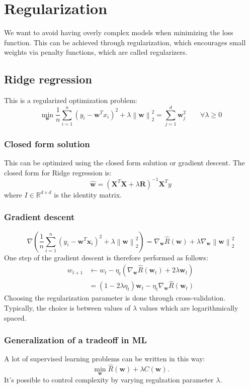\documentclass[a4paper,10pt,twoside]{article}
\newcommand\norm[1]{\left\lVert#1\right\rVert}
\begin{document}
\section{Regularization}
We want to avoid having overly complex models when minimizing the loss function. This can be achieved through regularization, which encourages small weights via penalty functions, which are called regularizers.

\subsection{Ridge regression}
This is a regularized optimization problem:
\begin{equation*}
    \min_{\mathbf{w}}\frac{1}{n}\sum_{i=1}^{n}(y_i-\mathbf{w}^Tx_i)^2+\lambda\norm{\mathbf{w}}^{2}_{2}=\sum_{j=1}^{d}\mathbf{w}_j^2\qquad\forall\lambda\geq 0
\end{equation*}
\subsubsection{Closed form solution}
This can be optimized using the closed form solution or gradient descent. The closed form for Ridge regression is:
\begin{equation*}
    \mathbf{\hat{w}}=(\mathbf{X}^T\mathbf{X}+\lambda\mathbf{R})^{-1}\mathbf{X}^Ty
\end{equation*}
where $I\in\mathbb{R}^{d\times d}$ is the identity matrix.
\subsubsection{Gradient descent}
\begin{equation*}
    \nabla\left(\frac{1}{n}\sum_{i=1}^{n}(y_i-\mathbf{w}^T\mathbf{x}_i)^2 + \lambda\norm{\mathbf{w}}^{2}_{2}\right) = \nabla_{\mathbf{w}}\hat{R}(\mathbf{w})+\lambda \nabla_{\mathbf{w}}\norm{\mathbf{w}}^{2}_{2}
\end{equation*}
One step of the gradient descent is therefore performed as follows:
\begin{align*}
    w_{t+1}&\leftarrow w_t-\eta_t(\nabla_{\mathbf{w}}\hat{R}(\mathbf{w}_t)+2\lambda\mathbf{w}_t)\\
    &=(1-2\lambda\eta_t)\mathbf{w}_t-\eta_t\nabla_{\mathbf{w}}\hat{R}(\mathbf{w}_t)
\end{align*}
Choosing the regularization parameter is done through cross-validation. Typically, the choice is between values of $\lambda$ values which are logarithmically spaced.
\subsubsection{Generalization of a tradeoff in ML}
A lot of supervised learning problems can be written in this way:
\begin{equation*}
    \min_{\mathbf{w}}\hat{R}(\mathbf{w})+\lambda C(\mathbf{w}).
\end{equation*}
It's possible to control complexity by varying regulzation parameter $\lambda$.
\end{document}
